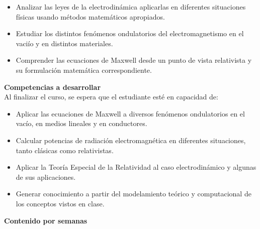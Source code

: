 \documentclass[letterpaper,10pt,onecolumn]{article}
\begin{document}
\begin{itemize}
	\item Analizar las leyes de la electrodin\'amica aplicarlas en
          diferentes situaciones f\'isicas usando m\'etodos
          matem\'aticos apropiados.\\[-0.6cm] 
	\item Estudiar los distintos fen\'omenos ondulatorios del
          electromagnetismo en el vaci\'io y en distintos
          materiales.\\[-0.6cm] 
	\item Comprender las ecuaciones de Maxwell desde un punto de
          vista relativista y su formulaci\'on matem\'atica
          correspondiente.\\[-0.2cm] 
\end{itemize}

\noindent\textbf{\large {} \quad Competencias a
  desarrollar}\\[-0.2cm] 


\noindent\normalsize Al finalizar el curso, se espera que el
estudiante est\'e en capacidad de: 

\begin{itemize}
	\item Aplicar las ecuaciones de Maxwell a diversos fen\'omenos
          ondulatorios en el vac\'io, en medios lineales y en
          conductores.\\[-0.6cm]
	\item Calcular potencias de radiaci\'on electromagn\'etica en
          diferentes situaciones, tanto cl\'asicas como
          relativistas.\\[-0.6cm] 
	\item Aplicar la Teor\'ia Especial de la Relatividad al caso
          electrodin\'amico y algunas de sus aplicaciones.\\[-0.6cm] 
	\item Generar conocimiento a partir del modelamiento te\'orico
          y computacional de los conceptos vistos en clase.\\[-0.2cm] 
\end{itemize}

\noindent\textbf{\large {} \quad Contenido por
  semanas}\\[-0.2cm] 

\end{document}
